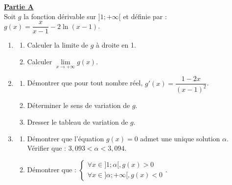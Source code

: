 \documentclass[12pt,a4paper]{article}
\begin{document}
\noindent \underline{\textbf{Partie A}} \\
Soit $g$ la fonction dérivable sur $]1; +\infty[$ et définie par : $g(x) = \dfrac{x}{x-1} - 2\ln(x-1)$.
\begin{enumerate}
    \item \begin{enumerate}
        \item Calculer la limite de $g$ à droite en 1.
        \item Calculer $\lim\limits_{x \to +\infty} g(x)$.
    \end{enumerate}
    \item \begin{enumerate}
        \item Démontrer que pour tout nombre réel, $g'(x) = \dfrac{1-2x}{(x-1)^2}$.
        \item Déterminer le sens de variation de $g$.
        \item Dresser le tableau de variation de $g$.
    \end{enumerate}
    \item \begin{enumerate}
        \item Démontrer que l'équation $g(x) = 0$ admet une unique solution $\alpha$. \\
        Vérifier que : $3,093 < \alpha < 3,094$.
        \item Démontrer que : 
        $\begin{cases} \forall x \in ]1; \alpha[, g(x) > 0 \\ \forall x \in ]\alpha; +\infty[, g(x) < 0 \end{cases}$.
    \end{enumerate}
\end{enumerate}

\vspace{0.5cm}
\end{document}
